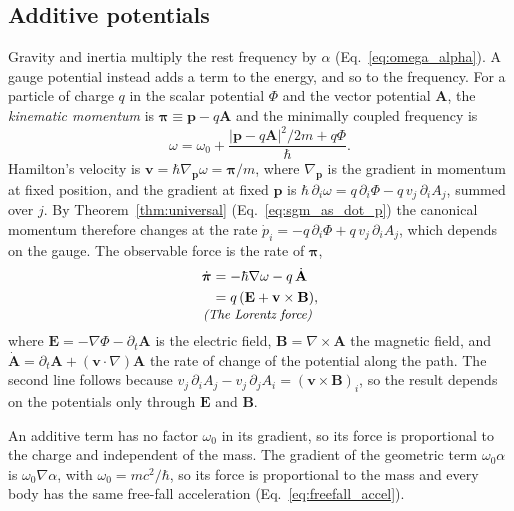 \documentclass[aps,prd,onecolumn,tightenlines,nofootinbib,notitlepage,11pt,floatfix]{revtex4-2}
\theoremstyle{indentedtheorem}
\begin{document}
\subsection{Additive potentials}
\label{sec:em}

Gravity and inertia multiply the rest frequency by $\alpha$ (Eq.~\eqref{eq:omega_alpha}). A gauge potential instead adds a term to the energy, and so to the frequency. For a particle of charge $q$ in the scalar potential $\Phi$ and the vector potential $\mathbf{A}$, the \emph{kinematic momentum} is $\boldsymbol{\pi}\equiv\mathbf{p}-q\mathbf{A}$ and the minimally coupled frequency is
\begin{equation}
    \omega = \omega_0 + \frac{|\mathbf{p}-q\mathbf{A}|^2/2m + q\Phi}{\hbar} .
    \label{eq:omega_em}
\end{equation}
Hamilton's velocity is $\mathbf{v}=\hbar\nabla_{\mathbf{p}}\omega=\boldsymbol{\pi}/m$, where $\nabla_{\mathbf{p}}$ is the gradient in momentum at fixed position, and the gradient at fixed $\mathbf{p}$ is $\hbar\,\partial_i\omega=q\,\partial_i\Phi-q\,v_j\,\partial_iA_j$, summed over $j$. By Theorem~\ref{thm:universal} (Eq.~\eqref{eq:sgm_as_dot_p}) the canonical momentum therefore changes at the rate $\dot{p}_i=-q\,\partial_i\Phi+q\,v_j\,\partial_iA_j$, which depends on the gauge. The observable force is the rate of $\boldsymbol{\pi}$,
\begin{align}
    \dot{\boldsymbol{\pi}} &= -\hbar\nabla\omega-q\,\dot{\mathbf{A}} \notag\\
    &= q \, (\mathbf{E}+\mathbf{v}\times\mathbf{B}) ,
    \label{eq:lorentz} \\[-3pt]
    \multispan2{\hfil\text{\small\itshape (The Lorentz force)}\hfil} \notag
\end{align}
where $\mathbf{E}=-\nabla\Phi-\partial_t\mathbf{A}$ is the electric field, $\mathbf{B}=\nabla\times\mathbf{A}$ the magnetic field, and $\dot{\mathbf{A}}=\partial_t\mathbf{A}+(\mathbf{v}\cdot\nabla)\mathbf{A}$ the rate of change of the potential along the path. The second line follows because $v_j\,\partial_iA_j-v_j\,\partial_jA_i=(\mathbf{v}\times\mathbf{B})_i$, so the result depends on the potentials only through $\mathbf{E}$ and $\mathbf{B}$.

An additive term has no factor $\omega_0$ in its gradient, so its force is proportional to the charge and independent of the mass. The gradient of the geometric term $\omega_0\alpha$ is $\omega_0\nabla\alpha$, with $\omega_0=mc^2/\hbar$, so its force is proportional to the mass and every body has the same free-fall acceleration (Eq.~\eqref{eq:freefall_accel}).
\end{document}
